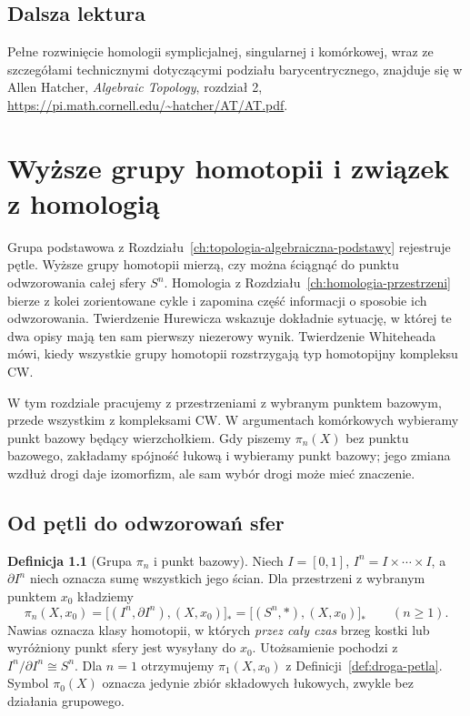 \documentclass[11pt,a4paper,oneside]{report}
\theoremstyle{plain}
\theoremstyle{definition}
\newtheorem{definicja}[twierdzenie]{Definicja}
\theoremstyle{remark}
\begin{document}
\section*{Dalsza lektura}
Pełne rozwinięcie homologii symplicjalnej,
singularnej i komórkowej, wraz ze
szczegółami technicznymi dotyczącymi
podziału barycentrycznego, znajduje się
w Allen Hatcher,
\emph{Algebraic Topology}, rozdział 2,
\url{https://pi.math.cornell.edu/~hatcher/AT/AT.pdf}.
\clearpage

\chapter{Wyższe grupy homotopii i związek z homologią}
\label{ch:wyzsza-homotopia}

Grupa podstawowa z Rozdziału~\ref{ch:topologia-algebraiczna-podstawy}
rejestruje pętle. Wyższe grupy homotopii mierzą, czy można
ściągnąć do punktu odwzorowania całej sfery $S^n$. Homologia z
Rozdziału~\ref{ch:homologia-przestrzeni} bierze z kolei
zorientowane cykle i zapomina część informacji o sposobie ich
odwzorowania. Twierdzenie Hurewicza wskazuje dokładnie sytuację,
w której te dwa opisy mają ten sam pierwszy niezerowy wynik.
Twierdzenie Whiteheada mówi, kiedy wszystkie grupy homotopii
rozstrzygają typ homotopijny kompleksu CW.

W tym rozdziale pracujemy z przestrzeniami z wybranym punktem bazowym,
przede wszystkim z kompleksami CW. W argumentach komórkowych
wybieramy punkt bazowy będący wierzchołkiem. Gdy piszemy
$\pi_n(X)$ bez punktu bazowego, zakładamy spójność łukową i
wybieramy punkt bazowy; jego zmiana wzdłuż drogi daje izomorfizm, ale
sam wybór drogi może mieć znaczenie.

\section{Od pętli do odwzorowań sfer}
\label{sec:grupy-pi-n}

\begin{definicja}[Grupa $\pi_n$ i punkt bazowy]
\label{def:pi-n}
Niech $I=[0,1]$, $I^n=I\times\cdots\times I$, a
$\partial I^n$ niech oznacza sumę wszystkich jego ścian.
Dla przestrzeni z wybranym punktem $x_0$ kładziemy
\[
 \pi_n(X,x_0)
 =\big[(I^n,\partial I^n),(X,x_0)\big]_*
 =\big[(S^n,*),(X,x_0)\big]_*
 \qquad(n\geq1).
\]
Nawias oznacza klasy homotopii, w których
\emph{przez cały czas} brzeg kostki lub wyróżniony
punkt sfery jest wysyłany do $x_0$.
Utożsamienie pochodzi z $I^n/\partial I^n\cong S^n$.
Dla $n=1$ otrzymujemy $\pi_1(X,x_0)$ z
Definicji~\ref{def:droga-petla}. Symbol $\pi_0(X)$
oznacza jedynie zbiór składowych łukowych,
zwykle bez działania grupowego.
\end{definicja}
\end{document}
